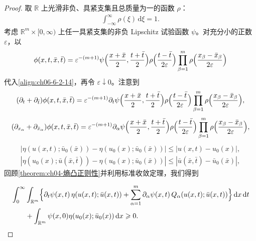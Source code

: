 \documentclass[../../main.tex]{subfiles}
\begin{document}
\begin{proof}
取 $\mathbb{R}$ 上光滑非负、具紧支集且总质量为一的函数 $\rho$：
\begin{align}
\int_{-\infty}^{\infty}\rho(\xi)\,\mathrm{d}\xi=1.
\label{align:ch06-6-2-15}
\end{align}
考虑 $\mathbb{R}^{m}\times[0,\infty)$ 上任一具紧支集的非负 Lipschitz 试验函数 $\psi$。对充分小的正数 $\varepsilon$，以
\begin{align}
\phi(x,t,\bar{x},\bar{t})=\varepsilon^{-(m+1)}\psi\Bigl{(}\frac{x+\bar{x}}{2},\frac{t+\bar{t}}{2}\Bigr{)}\rho\Bigl{(}\frac{t-\bar{t}}{2\varepsilon}\Bigr{)}\prod_{\beta=1}^{m}\rho\Bigl{(}\frac{x_{\beta}-\bar{x}_{\beta}}{2\varepsilon}\Bigr{)}
\label{align:ch06-6-2-16}
\end{align}
代入\eqref{align:ch06-6-2-14}，再令 $\varepsilon\downarrow 0$。注意到
\begin{align}
(\partial_{t}+\partial_{\bar{t}})\phi(x,t,\bar{x},\bar{t})=\varepsilon^{-(m+1)}\partial_{t}\psi\Bigl{(}\frac{x+\bar{x}}{2},\frac{t+\bar{t}}{2}\Bigr{)}\rho\Bigl{(}\frac{t-\bar{t}}{2\varepsilon}\Bigr{)}\prod_{\beta=1}^{m}\rho\Bigl{(}\frac{x_{\beta}-\bar{x}_{\beta}}{2\varepsilon}\Bigr{)},
\label{align:ch06-6-2-17}
\end{align}
\begin{align}
(\partial_{x_{\alpha}}+\partial_{\bar{x}_{\alpha}})\phi(x,t,\bar{x},\bar{t})=\varepsilon^{-(m+1)}\partial_{\alpha}\psi\Bigl{(}\frac{x+\bar{x}}{2},\frac{t+\bar{t}}{2}\Bigr{)}\rho\Bigl{(}\frac{t-\bar{t}}{2\varepsilon}\Bigr{)}\prod_{\beta=1}^{m}\rho\Bigl{(}\frac{x_{\beta}-\bar{x}_{\beta}}{2\varepsilon}\Bigr{)},
\label{align:ch06-6-2-18}
\end{align}
\begin{align}
|\eta(u(x,t);\bar{u}_{0}(\bar{x}))-\eta(u_{0}(x);\bar{u}_{0}(\bar{x}))|\leqslant|u(x,t)-u_{0}(x)|,
\label{align:ch06-6-2-19}
\end{align}
\begin{align}
|\eta(u_{0}(x);\bar{u}(\bar{x},\bar{t}))-\eta(u_{0}(x);\bar{u}_{0}(\bar{x}))|\leqslant|\bar{u}(\bar{x},\bar{t})-\bar{u}_{0}(\bar{x})|,
\label{align:ch06-6-2-20}
\end{align}
回顾\cref{theorem:ch04-熵凸正则性}并利用标准收敛定理，我们得到

\begin{align}
&\int_{0}^{\infty}\int_{\mathbb{R}^{m}}\Bigl{\{}\partial_{t}\psi(x,t)\,\eta(u(x,t);\bar{u}(x,t))+\sum_{\alpha=1}^{m}\partial_{\alpha}\psi(x,t)\,Q_{\alpha}(u(x,t);\bar{u}(x,t))\Bigr{\}}\,\mathrm{d}x\,\mathrm{d}t\notag\\
&\qquad+\int_{\mathbb{R}^{m}}\psi(x,0)\eta(u_{0}(x);\bar{u}_{0}(x))\,\mathrm{d}x\geqslant 0.
\label{align:ch06-6-2-21}
\end{align}


\end{proof}
\end{document}

